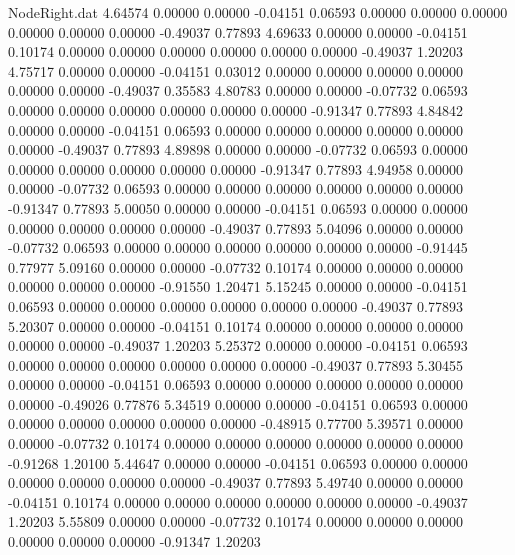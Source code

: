 \begin{filecontents}{NodeRight.dat}
   4.64574    0.00000    0.00000    -0.04151    0.06593    0.00000    0.00000    0.00000    0.00000    0.00000    0.00000   -0.49037    0.77893
   4.69633    0.00000    0.00000    -0.04151    0.10174    0.00000    0.00000    0.00000    0.00000    0.00000    0.00000   -0.49037    1.20203
   4.75717    0.00000    0.00000    -0.04151    0.03012    0.00000    0.00000    0.00000    0.00000    0.00000    0.00000   -0.49037    0.35583
   4.80783    0.00000    0.00000    -0.07732    0.06593    0.00000    0.00000    0.00000    0.00000    0.00000    0.00000   -0.91347    0.77893
   4.84842    0.00000    0.00000    -0.04151    0.06593    0.00000    0.00000    0.00000    0.00000    0.00000    0.00000   -0.49037    0.77893
   4.89898    0.00000    0.00000    -0.07732    0.06593    0.00000    0.00000    0.00000    0.00000    0.00000    0.00000   -0.91347    0.77893
   4.94958    0.00000    0.00000    -0.07732    0.06593    0.00000    0.00000    0.00000    0.00000    0.00000    0.00000   -0.91347    0.77893
   5.00050    0.00000    0.00000    -0.04151    0.06593    0.00000    0.00000    0.00000    0.00000    0.00000    0.00000   -0.49037    0.77893
   5.04096    0.00000    0.00000    -0.07732    0.06593    0.00000    0.00000    0.00000    0.00000    0.00000    0.00000   -0.91445    0.77977
   5.09160    0.00000    0.00000    -0.07732    0.10174    0.00000    0.00000    0.00000    0.00000    0.00000    0.00000   -0.91550    1.20471
   5.15245    0.00000    0.00000    -0.04151    0.06593    0.00000    0.00000    0.00000    0.00000    0.00000    0.00000   -0.49037    0.77893
   5.20307    0.00000    0.00000    -0.04151    0.10174    0.00000    0.00000    0.00000    0.00000    0.00000    0.00000   -0.49037    1.20203
   5.25372    0.00000    0.00000    -0.04151    0.06593    0.00000    0.00000    0.00000    0.00000    0.00000    0.00000   -0.49037    0.77893
   5.30455    0.00000    0.00000    -0.04151    0.06593    0.00000    0.00000    0.00000    0.00000    0.00000    0.00000   -0.49026    0.77876
   5.34519    0.00000    0.00000    -0.04151    0.06593    0.00000    0.00000    0.00000    0.00000    0.00000    0.00000   -0.48915    0.77700
   5.39571    0.00000    0.00000    -0.07732    0.10174    0.00000    0.00000    0.00000    0.00000    0.00000    0.00000   -0.91268    1.20100
   5.44647    0.00000    0.00000    -0.04151    0.06593    0.00000    0.00000    0.00000    0.00000    0.00000    0.00000   -0.49037    0.77893
   5.49740    0.00000    0.00000    -0.04151    0.10174    0.00000    0.00000    0.00000    0.00000    0.00000    0.00000   -0.49037    1.20203
   5.55809    0.00000    0.00000    -0.07732    0.10174    0.00000    0.00000    0.00000    0.00000    0.00000    0.00000   -0.91347    1.20203

\end{filecontents}
